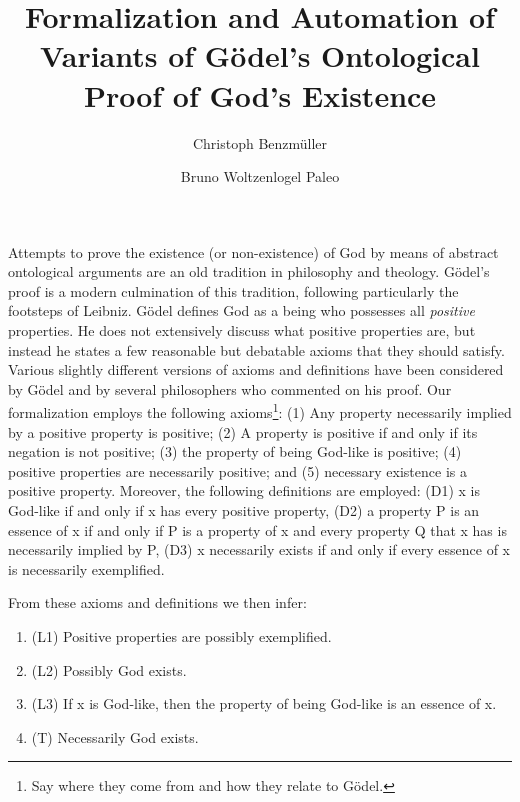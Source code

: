 \documentclass{llncs}
\title{
  Formalization and Automation of Variants of G\"{o}del's Ontological Proof of 
  God's Existence
}
\author{
  Christoph Benzm\"{u}ller\inst{1} 
  \and 
  Bruno Woltzenlogel Paleo\inst{2}
}
\institute{
  Dahlem Center for Intelligent Systems, Freie Universit\"{a}t Berlin, Germany\\
  \email{c.benzmueller@gmail.com}
  \and 
  Theory and Logic Group, Vienna University of Technology, Austria \\
  \email{bruno@logic.at}
}
\begin{document}
\maketitle

Attempts to prove the existence (or non-existence) of God by means of
abstract ontological arguments are an old tradition in philosophy and
theology.  G\"{o}del's proof \cite{Goedel} is a modern culmination of
this tradition, following particularly the footsteps of Leibniz.
%
G\"{o}del defines God as a being who possesses all \emph{positive} properties.
He does not extensively discuss what positive properties are, 
but instead he states a few reasonable but debatable axioms that they should satisfy.
Various slightly different versions of axioms and definitions have been considered by G\"{o}del and by several philosophers who commented on his proof. Our formalization employs the following axioms\footnote{Say where they come from and how they relate to G\"odel.}: (1) Any property necessarily implied by a positive property is positive;
(2) A property is positive if and only if its negation is not positive; (3) the property of being God-like is positive; (4) positive properties are necessarily positive; and (5) necessary existence is a positive property.
Moreover, the following definitions are employed:
(D1) x is God-like if and only if x has every positive property, (D2) a property P is an essence of x if and only if P is a property of x and every property Q that x has is necessarily implied by P, (D3) x necessarily exists if and only if every essence of x is necessarily exemplified.

From these axioms and definitions we then infer:
\begin{enumerate}
\item (L1) Positive properties are possibly exemplified.
\item (L2) Possibly God exists.
\item (L3) If x is God-like, then the property of being 
God-like is an essence of x.
\item (T) Necessarily God exists.
\end{enumerate}

\end{document}
